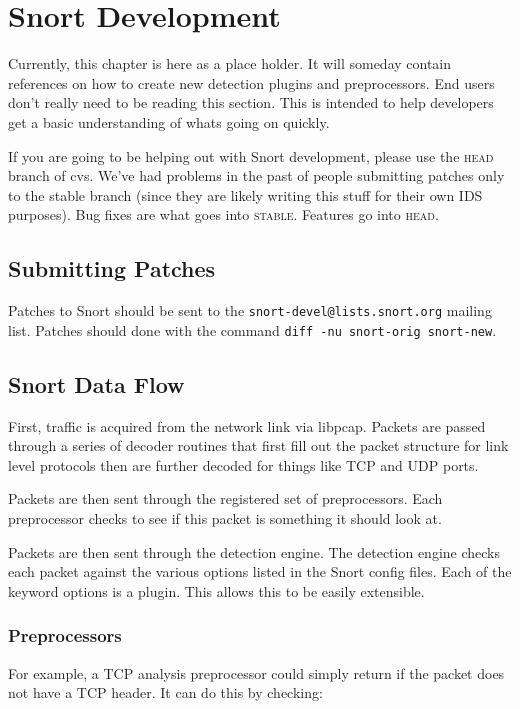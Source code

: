 \documentclass[english]{report}
\begin{document}
\chapter{Snort Development}

Currently, this chapter is here as a place holder. It will someday contain
references on how to create new detection plugins and preprocessors.  End users
don't really need to be reading this section. This is intended to help
developers get a basic understanding of whats going on quickly.

If you are going to be helping out with Snort development, please use the
\textsc{head} branch of cvs. We've had problems in the past of people
submitting patches only to the stable branch (since they are likely writing
this stuff for their own IDS purposes). Bug fixes are what goes into
\textsc{stable}. Features go into \textsc{head}.

\section{Submitting Patches}

Patches to Snort should be sent to the
\verb!snort-devel@lists.snort.org!
mailing list.  Patches should done with the command
\verb!diff -nu snort-orig snort-new!.

\section{Snort Data Flow}

First, traffic is acquired from the network link via libpcap. Packets are
passed through a series of decoder routines that first fill out the packet
structure for link level protocols then are further decoded for things like TCP
and UDP ports.

Packets are then sent through the registered set of preprocessors.  Each
preprocessor checks to see if this packet is something it should look at.

Packets are then sent through the detection engine. The detection engine checks
each packet against the various options listed in the Snort config files. Each
of the keyword options is a plugin. This allows this to be easily extensible.

\subsection{Preprocessors}

For example, a TCP analysis preprocessor could simply return if the packet does
not have a TCP header. It can do this by checking: 
\end{document}
